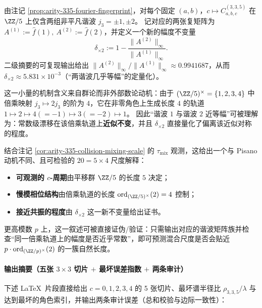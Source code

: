 \begin{remark}\label{rem:arity-335-mult-orbit-20-scale}
由注记 \ref{prop:arity-335-fourier-fingerprint}，对每个固定 \((a,b)\)，\(c\mapsto C^{(3,3,5)}_{a,b,c}\) 在 \(\ZZ/5\) 上仅含两组非平凡谐波 \(j_3=\pm 1,\pm 2\)。
记对应的两张复矩阵为
\(
A^{(1)}:=\widehat f(1),\ A^{(2)}:=\widehat f(2)
\)，并定义一个新的幅度不变量
\[
\delta_{\times 2}
:=
1-\frac{\|A^{(2)}\|_\infty}{\|A^{(1)}\|_\infty}.
\]
二级摘要的可复现输出给出
\(
\|A^{(2)}\|_\infty/\|A^{(1)}\|_\infty\approx 0.9941687
\)，从而 \(\delta_{\times 2}\approx 5.831\times 10^{-3}\)（“两谐波几乎等幅”的定量化）。
\par
这一小量的机制含义来自群论而非外部数论动机：由于 \((\ZZ/5)^\times=\{1,2,3,4\}\) 中倍乘映射 \(j_3\mapsto 2j_3\) 的阶为 \(4\)，它在非零角色上生成长度 \(4\) 的轨道
\(
1\mapsto 2\mapsto 4(=-1)\mapsto 3(=-2)\mapsto 1
\)。
因此“谐波 \(1\) 与谐波 \(2\) 近等幅”可被理解为：常数级漂移在该倍乘轨道上\textbf{近似不变}，并且 \(\delta_{\times 2}\) 直接量化了偏离该近似对称的程度。
\par
结合注记 \ref{cor:arity-335-collision-mixing-scale} 的 \(\tau_{\mathrm{mix}}\) 观测，这给出一个与 Pisano 动机不同、且可检验的 \(20=5\times 4\) 尺度解释：
\begin{itemize}
  \item \textbf{可观测的 \(c\)-周期}由平移群 \(\ZZ/5\) 的长度 \(5\) 决定；
  \item \textbf{慢模相位结构}由倍乘轨道的长度 \(\mathrm{ord}_{(\ZZ/5)^\times}(2)=4\) 控制；
  \item \textbf{接近共振的程度}由 \(\delta_{\times 2}\) 这一新不变量给出证书。
\end{itemize}
更高模数 \(p\) 上，这一叙述可被直接证伪/验证：只需输出对应的谐波矩阵族并检查“同一倍乘轨道上的幅度是否近乎常数”，即可预测混合尺度是否会贴近 \(p\cdot \mathrm{ord}_{(\ZZ/p)^\times}(2)\) 的一簇自然长度。
\end{remark}

\paragraph{输出摘要（五张 \texorpdfstring{$3\times 3$}{3x3} 切片 \texorpdfstring{$+$}{+} 最坏误差指数 \texorpdfstring{$+$}{+} 两条审计）}
下述 \LaTeX\ 片段直接给出 $c=0,1,2,3,4$ 的 5 张切片、最坏谱半径比 $\rho_{3,3,5}/\lambda$ 与达到最坏的角色索引，并输出两条审计误差（总和校验与边际一致性）：
